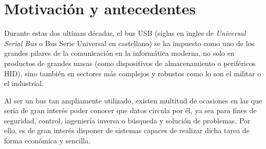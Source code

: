 \chapter{Motivación y antecedentes}
\label{ch:antecedentes}


Durante estas dos ultimas décadas, el bus USB (siglas en ingles de \emph{Universal Serial Bus} o Bus Serie Universal en castellano) se ha impuesto como uno de los grandes pilares de la comunicación en la informática moderna, no solo en productos de grandes masas (como dispositivos de almacenamiento o periféricos HID), sino también en sectores más complejos y robustos como lo son el militar o el industrial.

Al ser un bus tan ampliamente utilizado, existen multitud de ocasiones en las que sería de gran interés poder conocer que datos circula por él, ya sea para fines de seguridad\cite{NISSIM2017675}, control, ingeniería inversa o búsqueda y solución de problemas. Por ello, es de gran interés disponer de sistemas capaces de realizar dicha tarea de forma económica y sencilla.

